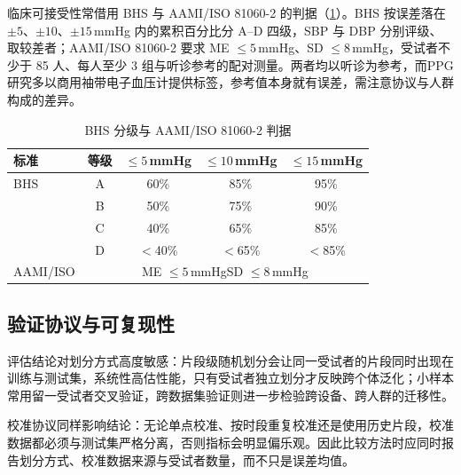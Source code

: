 临床可接受性常借用 BHS 与 AAMI/ISO 81060-2 的判据（\cref{tab:standards}）。BHS 按误差落在 $\pm5$、$\pm10$、$\pm15$\,mmHg 内的累积百分比分 A--D 四级，SBP 与 DBP 分别评级、取较差者；AAMI/ISO 81060-2 要求 ME $\le5$\,mmHg、SD $\le8$\,mmHg，受试者不少于 85 人、每人至少 3 组与听诊参考的配对测量\cite{obrien1993bhs,aami2013standard}。两者均以听诊为参考，而PPG研究多以商用袖带电子血压计提供标签，参考值本身就有误差，需注意协议与人群构成的差异。

\begin{table}[t]
\centering
\caption{BHS 分级与 AAMI/ISO 81060-2 判据}
\label{tab:standards}
\footnotesize
\setlength{\tabcolsep}{3.5pt}
\begin{tabular}{@{}lcccc@{}}
\toprule
标准 & 等级 & $\le5$\,mmHg & $\le10$\,mmHg & $\le15$\,mmHg \\
\midrule
BHS & A & 60\% & 85\% & 95\% \\
    & B & 50\% & 75\% & 90\% \\
    & C & 40\% & 65\% & 85\% \\
    & D & $<$40\% & $<$65\% & $<$85\% \\
\midrule
AAMI/ISO & \multicolumn{4}{c}{ME $\le5$\,mmHg\quad SD $\le8$\,mmHg} \\
\bottomrule
\end{tabular}
\end{table}

\subsection{验证协议与可复现性}
\label{sec:protocol}

评估结论对划分方式高度敏感：片段级随机划分会让同一受试者的片段同时出现在训练与测试集，系统性高估性能，只有受试者独立划分才反映跨个体泛化；小样本常用留一受试者交叉验证，跨数据集验证则进一步检验跨设备、跨人群的迁移性。

校准协议同样影响结论：无论单点校准、按时段重复校准还是使用历史片段，校准数据都必须与测试集严格分离，否则指标会明显偏乐观。因此比较方法时应同时报告划分方式、校准数据来源与受试者数量，而不只是误差均值。